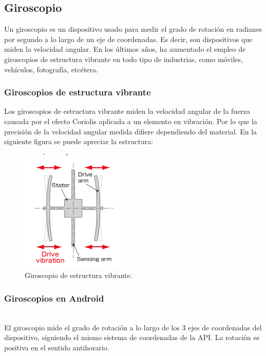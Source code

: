 \subsection{Giroscopio}

Un giroscopio es un dispositivo usado para medir el grado de rotación en radianes por segundo a lo largo de un eje de coordenadas. Es decir, son dispositivos que miden la velocidad angular.
\noindent
En los últimos años, ha aumentado el empleo de giroscopios de estructura vibrante en todo tipo de industrias, como móviles, vehículos, fotografía, etcétera.

\subsubsection{Giroscopios de estructura vibrante}

Los giroscopios de estructura vibrante miden la velocidad angular de la fuerza causada por el efecto Coriolis aplicada a un elemento en vibración. Por lo que la precisión de la velocidad angular medida difiere dependiendo del material. En la siguiente figura se puede apreciar la estructura:

\begin{figure}[H]
	\centering
	\includegraphics[scale=0.7]{imagenes/gyro.png}
	\caption{Giroscopio de estructura vibrante.}
	\label{Giroscopio de estructura vibrante}
\end{figure}

\subsubsection{Giroscopios en Android}
\\
El giroscopio mide el grado de rotación a lo largo de los 3 ejes de coordenadas del dispositivo, siguiendo el mismo sistema de coordenadas de la API. La rotación es positiva en el sentido anti\-horario.

